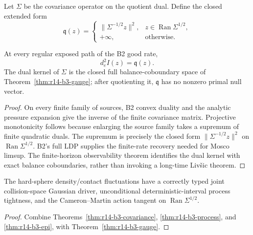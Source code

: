 Let \(\Sigma\) be the covariance operator on the quotient dual.  Define the
closed extended form
\[
 \mathfrak q(z)=
 \begin{cases}
 \|\Sigma^{-1/2}z\|^2,
 &z\in\operatorname{Ran}\Sigma^{1/2},\\
 +\infty,&\text{otherwise}.
 \end{cases}
\]

\begin{theorem}
\label{thm:r14-b3-epi}
At every regular exposed path of the B2 good rate,
\[
 d_e^2I(z)=\mathfrak q(z).
\]
The dual kernel of \(\Sigma\) is the closed full balance-coboundary space of
Theorem~\ref{thm:r14-b3-gauge}; after quotienting it,
\(\mathfrak q\) has no nonzero primal null vector.
\end{theorem}

\begin{proof}
On every finite family of sources, B2 convex duality and the analytic
pressure expansion give the inverse of the finite covariance matrix.
Projective monotonicity follows because enlarging the source family takes a
supremum of finite quadratic duals.  The supremum is precisely the closed
form \(\|\Sigma^{-1/2}z\|^2\) on
\(\operatorname{Ran}\Sigma^{1/2}\).  B2's full LDP supplies the
finite-rate recovery needed for Mosco limsup.  The finite-horizon
observability theorem identifies the dual kernel with exact balance
coboundaries, rather than invoking a long-time Liv\v{s}ic theorem.
\end{proof}

\begin{theorem}
\label{thm:r14-b3-main}
The hard-sphere density/contact fluctuations have a correctly typed joint
collision-space Gaussian driver, unconditional deterministic-interval process
tightness, and the Cameron--Martin action tangent on
\(\operatorname{Ran}\Sigma^{1/2}\).
\end{theorem}

\begin{proof}
Combine Theorems~\ref{thm:r14-b3-covariance},
\ref{thm:r14-b3-process}, and \ref{thm:r14-b3-epi}, with
Theorem~\ref{thm:r14-b3-gauge}.
\end{proof}

